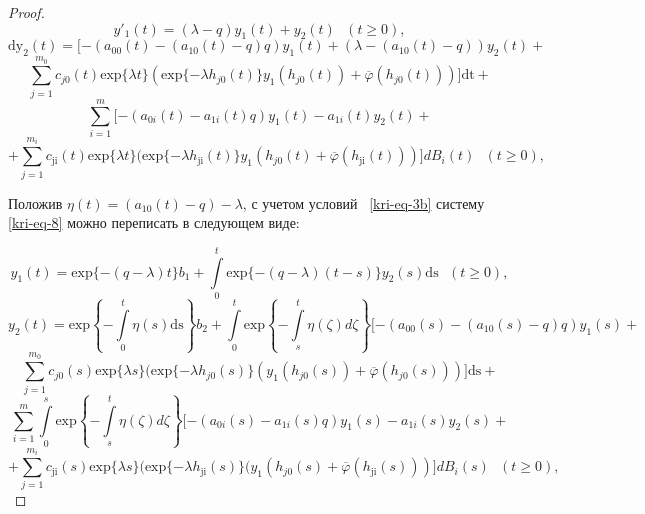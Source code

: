 \begin{proof}
\begin{equation*}
	y'_{1}(t)=(\lambda -q)y_1(t)+y_2(t)\text{   }(t\ge 0),
\end{equation*}
\begin{equation*}	
	\text{dy}_2(t)=[-(a_{00}(t)-(a_{10}(t)-q)q)y_1(t)+(\lambda -(a_{10}(t)-q))y_2(t)+
\end{equation*}
\begin{equation}\label{kri-eq-8}	
	\overset{m_0}{\underset{j=1}{\sum }}c_{\mathit{j0}}(t)\text{exp}\{\mathit{\lambda t}\}(\text{exp}\{-\mathit{\lambda
		h}_{\mathit{j0}}(t)\}y_1(h_{\mathit{j0}}(t))+\overline{\varphi
	}(h_{\mathit{j0}}(t)))]\text{dt}+
\end{equation}
\begin{equation*}
	\overset m{\underset{i=1}{\sum
	}}[-(a_{0i}(t)-a_{1i}(t)q)y_1(t)-a_{1i}(t)y_2(t)+
\end{equation*}
\begin{equation*}
	+\overset{m_i}{\underset{j=1}{\sum
	}}c_{\text{ji}}(t)\text{exp}\{\mathit{\lambda t}\}(\text{exp}\{-\mathit{\lambda
		h}_{\text{ji}}(t)\}y_1(h_{\mathit{j0}}(t)+\overline{\varphi
	}(h_{\text{ji}}(t)))]\mathit{dB}_i(t)\text{  }(t\ge 0),
\end{equation*}

Положив  $\eta (t)=(a_{10}(t)-q)-\lambda $, с учетом условий \ \eqref{kri-eq-3b} систему \eqref{kri-eq-8} можно переписать в следующем виде:

\begin{equation*}
	y_1(t)=\text{exp}\{-(q-\lambda )t\}b_1+\overset t{\underset 0{\int }}\text{exp}\{-(q-\lambda
	)(t-s)\}y_2(s)\text{ds}\text{   }(t\ge 0),
\end{equation*}
\begin{equation*}		
	y_2(t)=\text{exp}\left\{-\overset t{\underset 0{\int }}\eta (s)\text{ds}\right\}b_2+\overset
	t{\underset 0{\int }}\text{exp}\left\{-\overset t{\underset s{\int }}\eta (\zeta )\mathit{d\zeta
	}\right\}[-(a_{00}(s)-(a_{10}(s)-q)q)y_1(s)+
\end{equation*}	
\begin{equation}\label{kri-eq-9}
	\overset{m_0}{\underset{j=1}{\sum
	}}c_{\mathit{j0}}(s)\text{exp}\{\mathit{\lambda s}\}(\text{exp}\{-\mathit{\lambda
		h}_{\mathit{j0}}(s)\}(y_1(h_{\mathit{j0}}(s))+\overline{\varphi
	}(h_{\mathit{j0}}(s)))]\text{ds}+
\end{equation}	
\begin{equation*}
	\overset m{\underset{i=1}{\sum }}\overset s{\underset
		0{\int }}\text{exp}\left\{-\overset t{\underset s{\int }}\eta (\zeta )\mathit{d\zeta
	}\right\}[-(a_{0i}(s)-a_{1i}(s)q)y_1(s)-a_{1i}(s)y_2(s)+
\end{equation*}	
\begin{equation*}
	+\overset{m_i}{\underset{j=1}{\sum
	}}c_{\text{ji}}(s)\text{exp}\{\mathit{\lambda s}\}(\text{exp}\{-\mathit{\lambda
		h}_{\text{ji}}(s)\}(y_1(h_{\mathit{j0}}(s)+\overline{\varphi
	}(h_{\text{ji}}(s)))]\mathit{dB}_i(s)\text{  }(t\ge 0),
\end{equation*}


\end{proof}
